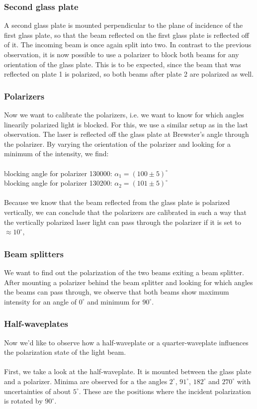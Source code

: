 \subsubsection{Second glass plate}
A second glass plate is mounted perpendicular to the plane of incidence of
the first glass plate, so that the beam reflected on the first glass plate
is reflected off of it. The incoming beam is once again split into two.
In contrast to the previous observation, it is now possible to use a
polarizer to block both beams for any orientation of the glass plate.
This is to be expected, since the beam that was reflected on plate 1 is
polarized, so both beams after plate 2 are polarized as well.

\newpage
\subsubsection{Polarizers}
Now we want to calibrate the polarizers, i.e. we want to know for which
angles linearily polarized light is blocked. For this, we use a similar
setup as in the last observation. The laser is reflected off the glass
plate at Brewster's angle through the polarizer. By varying the orientation
of the polarizer and looking for a minimum of the intensity, we find: \\ \\
blocking angle for polarizer 130000: $\alpha_1=(100 \pm 5)^\circ$ \\
blocking angle for polarizer 130200: $\alpha_2=(101 \pm 5)^\circ$ \\ \\
Because we know that the beam reflected from the glass plate is polarized
vertically, we can conclude that the polarizers are calibrated in
such a way that the vertically polarized laser light can pass through the
polarizer if it is set to $\approx10^\circ$,

\subsubsection{Beam splitters}
We want to find out the polarization of the two beams exiting a beam
splitter. After mounting a polarizer behind the beam splitter and looking
for which angles the beams can pass through, we observe that both beams
show maximum intensity for an angle of $0^\circ$ and minimum for $90^\circ$.

\subsubsection{Half-waveplates}
Now we'd like to observe how a half-waveplate or a quarter-waveplate
influences the polarization state of the light beam. \\ \\
First, we take a look at the half-waveplate. It is mounted between the
glass plate and a polarizer. Minima are observed for a the angles
$2^\circ$, $91^\circ$, $182^\circ$ and $270^\circ$ with uncertainties of
about $5^\circ$. These are the positions where the incident polarization
is rotated by $90^\circ$.

